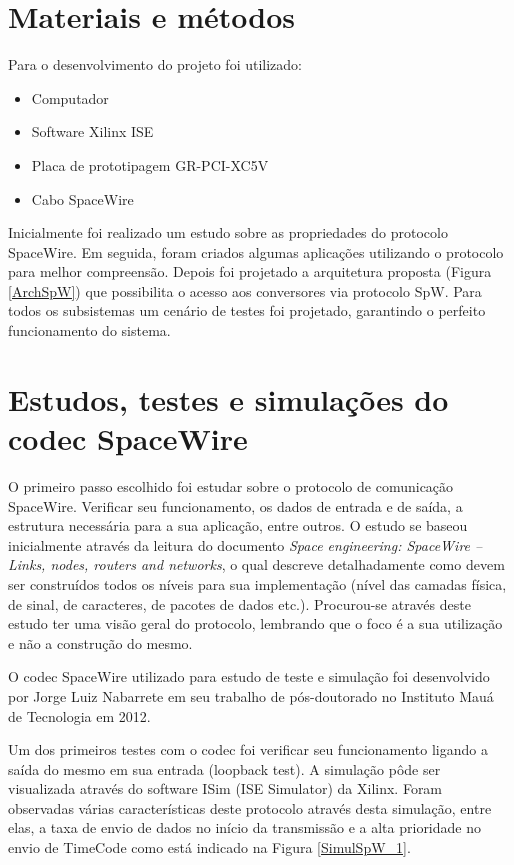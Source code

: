 \section{Materiais e métodos}
Para o desenvolvimento do projeto foi utilizado:

\begin{itemize}
	\item Computador
	\item Software Xilinx ISE
	\item Placa de prototipagem GR-PCI-XC5V
	\item Cabo SpaceWire
\end{itemize}

Inicialmente foi realizado um estudo sobre as propriedades do protocolo SpaceWire. Em seguida, foram criados algumas aplicações utilizando o protocolo para melhor compreensão. Depois foi projetado a arquitetura proposta (Figura \ref{ArchSpW}) que possibilita o acesso aos conversores via protocolo SpW. Para todos os subsistemas um cenário de testes foi projetado, garantindo o perfeito funcionamento do sistema.



\section{Estudos, testes e simulações do codec SpaceWire}

\let\thefootnote\svthefootnote
O primeiro passo escolhido foi estudar sobre o protocolo de comunicação SpaceWire. Verificar seu funcionamento, os dados de entrada e de saída, a estrutura necessária para a sua aplicação, entre outros. O estudo se baseou inicialmente através da leitura do documento \textit{Space engineering: SpaceWire – Links, nodes, routers and networks}, o qual descreve detalhadamente como devem ser construídos todos os níveis para sua implementação (nível das camadas física, de sinal, de caracteres, de pacotes de dados etc.). Procurou-se através deste estudo ter uma visão geral do protocolo, lembrando que o foco é a sua utilização e não a construção do mesmo.

O codec SpaceWire utilizado para estudo de teste e simulação foi desenvolvido por Jorge Luiz Nabarrete em seu trabalho de pós-doutorado no Instituto Mauá de Tecnologia em 2012.

Um dos primeiros testes com o codec foi verificar seu funcionamento ligando a saída do mesmo em sua entrada (loopback test). A simulação pôde ser visualizada através do software ISim (ISE Simulator) da Xilinx. Foram observadas várias características deste protocolo através desta simulação, entre elas, a taxa de envio de dados no início da transmissão e a alta prioridade no envio de TimeCode como está indicado na Figura \ref{SimulSpW_1}.

